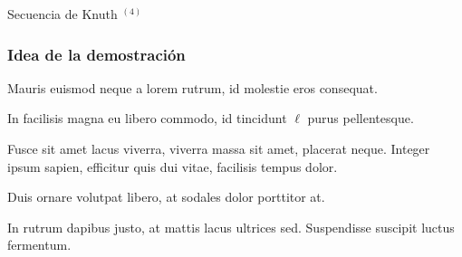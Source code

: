 \documentclass[t, 10pt, mathserif]{beamer}
\begin{document}
\begin{frame}{Secuencia de Knuth {$^{(4)}$}}
  \vspace{-0.5cm}
\end{frame}
 

\begin{frame}
  \frametitle{Idea de la demostración}

  Mauris euismod neque a lorem rutrum, id molestie eros consequat.
  \pause
  
  In facilisis magna eu libero commodo, id tincidunt {\color{magenta} $\ell$} purus pellentesque.
  \pause

  \medskip
  \begin{definition}
    Fusce sit amet lacus viverra, viverra massa sit amet, placerat neque. Integer ipsum sapien, efficitur quis dui vitae, facilisis tempus dolor.
    \pause

    Duis ornare volutpat libero, at sodales dolor porttitor at.
    \pause
  \end{definition}

  In rutrum dapibus justo, at mattis lacus ultrices sed. Suspendisse suscipit luctus fermentum.
\end{frame}
\end{document}
